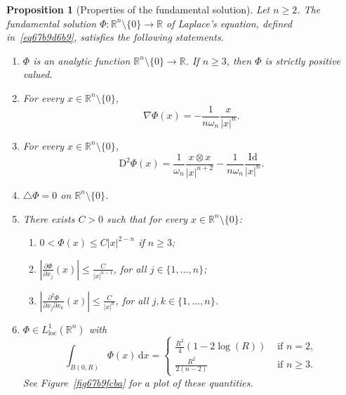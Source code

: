 \documentclass[a4paper,9pt]{amsart}
\newcommand{\R}{\mathbb{R}}	%
\newcommand{\Id}{\mathrm{Id}}	%
\newcommand{\did}{\,\mathrm{d}}	%
\newcommand{\de}{\partial}		%
\newcommand{\Diff}{\mathrm{D}}
\newcommand{\loc}{\mathrm{loc}}
\newcommand{\laplacian}{\triangle}
\newcommand{\grad}{\nabla}
\theoremstyle{plain}
\newtheorem{proposition}{Proposition}[section]
\theoremstyle{definition}
\theoremstyle{remark}
\begin{document}
\begin{proposition}[Properties of the fundamental solution]\label{prop67b9d700}
	Let $n\ge2$.
	The fundamental solution $\Phi:\R^n\setminus\{0\}\to\R$ of Laplace's equation,
	defined in~\eqref{eq67b9d6b9}, satisfies the following statements.
	\begin{enumerate}
	\item\label{prop67b9d700_anal}
	$\Phi$ is an analytic function $\R^n\setminus\{0\}\to\R$.
	If $n\ge3$, then $\Phi$ is strictly positive valued.
	\item\label{prop67b9d700_grad}
	For every $x\in\R^n\setminus\{0\}$,
	\begin{equation}\label{eq67b9dc62}
		\grad\Phi(x)
		= - \frac1{n\omega_n } \frac{x}{|x|^n} .
	\end{equation}
	\item\label{prop67b9d700_hess}
	For every $x\in\R^n\setminus\{0\}$,
	\begin{equation}\label{eq67b9f252}
		\Diff^2\Phi(x)
		= \frac1{\omega_n } \frac{x\otimes x}{|x|^{n+2}} - \frac{1}{n\omega_n } \frac{\Id}{|x|^n} .
	\end{equation}
	\item\label{prop67b9d700_laplacian}
	 $\laplacian\Phi=0$ on $\R^n\setminus\{0\}$.
	\item\label{prop67b9d700_estimates}
	There exists $C>0$ such that for every $x\in \R^n\setminus\{0\}$:
		\begin{enumerate}
		\item\label{prop67b9d700_2_a}
		 $0<\Phi(x)\le C |x|^{2-n}$ if $n\ge 3$;
		\item\label{prop67b9d700_2_b}
		 $\left| \frac{\de\Phi}{\de x_j}(x)\right| \le \frac{C}{|x|^{n-1}}$, for all $j\in\{1,\dots,n\}$;
		\item\label{prop67b9d700_2_c}
		 $\left| \frac{\de^2\Phi}{\de x_j\de x_k}(x)\right| \le \frac{C}{|x|^{n}}$, for all $j,k\in\{1,\dots,n\}$.
		\end{enumerate}
	\item\label{prop67b9d700_integrals}
	$\Phi\in L^1_\loc(\R^n)$ with 
	\begin{equation}\label{eq67ba10db}
		\int_{B(0,R)} \Phi(x)\did x =
		\begin{cases}
			\frac{R^2}{4} (1 - 2\log(R)) & \text{ if }n=2, \\
			\frac{R^2}{2(n-2)}  & \text{ if }n\ge3. 
		\end{cases}
	\end{equation}
		See Figure~\ref{fig67b9fcba} for a plot of these quantities.
	\end{enumerate}
\end{proposition}
\end{document}
